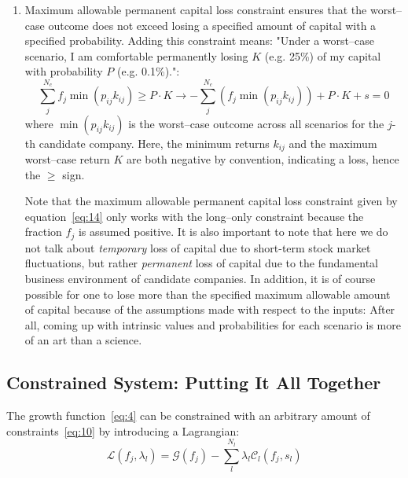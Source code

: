 \documentclass{article}
\begin{document}
\begin{enumerate}
    \item Maximum allowable permanent capital loss constraint ensures that the
    worst--case outcome does not exceed losing a specified amount of capital
    with a specified probability. Adding this constraint means: "Under a
    worst--case scenario, I am comfortable permanently losing $K$ (e.g. 25\%) of
    my capital with probability $P$ (e.g. 0.1\%).":
        \begin{equation}
        \label{eq:14}
            \sum_j^{N_c} f_j \min(p_{ij} k_{ij}) \ge P \cdot K \rightarrow
            -\sum_j^{N_c} \left(f_j \min(p_{ij} k_{ij}) \right) + P \cdot K + s = 0
        \end{equation}
    \noindent where $\min(p_{ij} k_{ij})$ is the worst--case outcome across all
    scenarios for the $j$-th candidate company. Here, the minimum returns
    $k_{ij}$ and the maximum worst--case return $K$ are both negative by
    convention, indicating a loss, hence the $\ge$ sign.

\indent Note that the maximum allowable permanent capital loss constraint
given by equation~\eqref{eq:14} only works with the long--only constraint
because the fraction $f_j$ is assumed positive. It is also important to note
that here we do not talk about {\it temporary} loss of capital due to short-term
stock market fluctuations, but rather {\it permanent} loss of capital due to the
fundamental business environment of candidate companies. In addition, it is of
course possible for one to lose more than the specified maximum allowable amount
of capital because of the assumptions made with respect to the inputs: After
all, coming up with intrinsic values and probabilities for each scenario is more
of an art than a science.

\end{enumerate}

\subsection{Constrained System: Putting It All Together}
\label{sec:constrainedSystem}

\noindent The growth function~\eqref{eq:4} can be constrained with an arbitrary
amount of constraints~\eqref{eq:10} by introducing a Lagrangian:
\begin{equation}
\label{eq:15}
    \mathcal{L}(f_j, \lambda_l)
  =
    \mathcal{G}(f_j) - \sum_l^{N_l} \lambda_l \mathcal{C}_l(f_j, s_l)
\end{equation}
\end{document}
